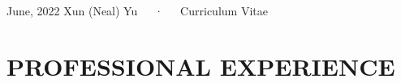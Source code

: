 \documentclass[11pt,a4paper,]{awesome-cv}
\begin{document}
\makecvheader

\makecvfooter
  {June, 2022}
    {Xun (Neal) Yu~~~·~~~Curriculum Vitae}
  {\thepage}





\hypertarget{professional-experience}{%
\section{PROFESSIONAL EXPERIENCE}\label{professional-experience}}
\end{document}
